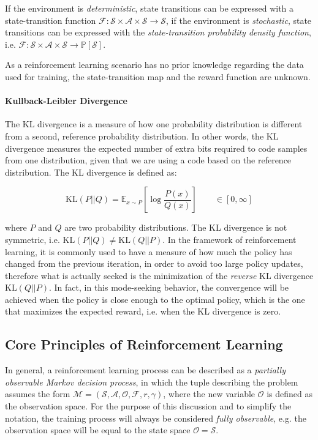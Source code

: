 If the environment is \textit{deterministic}, state transitions can be expressed with a state-transition function $\mathcal{F}: \mathcal{S} \times \mathcal{A} \times \mathcal{S} \rightarrow \mathcal{S}$, if the environment is \textit{stochastic}, state transitions can be expressed with the \textit{state-transition probability density function}, i.e. $\mathcal{F}: \mathcal{S} \times \mathcal{A} \times \mathcal{S} \rightarrow \mathbb{P}[\mathcal{S}]$.

As a reinforcement learning scenario has no prior knowledge regarding the data used for training, the state-transition map and the reward function are unknown.


\paragraph{Kullback-Leibler Divergence} The \ac{KL} divergence is a measure of how one probability distribution is different from a second, reference probability distribution. In other words, the \ac{KL} divergence measures the expected number of extra bits required to code samples from one distribution, given that we are using a code based on the reference distribution. The \ac{KL} divergence is defined as:

\begin{equation}
    \mathrm{KL}(P||Q) = \mathbb{E} _{x \sim P} \left[ \log \frac{P(x)}{Q(x)} \right] \qquad \in \left[0, \infty \right]
\end{equation}

where $P$ and $Q$ are two probability distributions. The \ac{KL} divergence is not symmetric, i.e. $\mathrm{KL}(P||Q) \neq \mathrm{KL}(Q||P)$. In the framework of reinforcement learning, it is commonly used to have a measure of how much the policy has changed from the previous iteration, in order to avoid too large policy updates, therefore what is actually seeked is the minimization of the \textit{reverse} \ac{KL} divergence $\mathrm{KL}(Q||P)$. In fact, in this mode-seeking behavior, the convergence will be achieved when the policy is close enough to the optimal policy, which is the one that maximizes the expected reward, i.e. when the \ac{KL} divergence is zero.

\subsection{Core Principles of Reinforcement Learning}

In general, a reinforcement learning process can be described as a \textit{partially observable Markov decision process}, in which the tuple describing the problem assumes the form $\mathcal{M} =  (\mathcal{S}, \mathcal{A}, \mathcal{O}, \mathcal{F}, r, \gamma)$, where the new variable $\mathcal{O}$ is defined as the observation space. For the purpose of this discussion and to simplify the notation, the training process will always be considered \textit{fully observable}, e.g. the observation space will be equal to the state space $\mathcal{O} = \mathcal{S}$.

